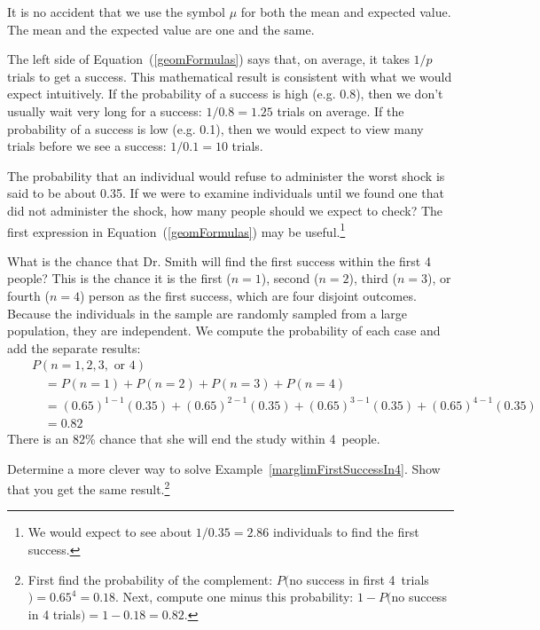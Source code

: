 It is no accident that we use the symbol $\mu$ for both the mean and expected value. The mean and the expected value are one and the same.

The left side of Equation~(\ref{geomFormulas}) says that, on average, it takes $1/p$ trials to get a success. This mathematical result is consistent with what we would expect intuitively. If the probability of a success is high (e.g. 0.8), then we don't usually wait very long for a success: $1/0.8 = 1.25$ trials on average. If the probability of a success is low (e.g. 0.1), then we would expect to view many trials before we see a success: $1/0.1 = 10$ trials.

\begin{exercise}
The probability that an individual would refuse to administer the worst shock is said to be about 0.35. If we were to examine individuals until we found one that did not administer the shock, how many people should we expect to check? The first expression in Equation~(\ref{geomFormulas}) may be useful.\footnote{We would expect to see about $1/0.35 = 2.86$ individuals to find the first success.}
\end{exercise}

\begin{example}{What is the chance that Dr. Smith will find the first success within the first 4 people?} \label{marglimFirstSuccessIn4}
This is the chance it is the first ($n=1$), second ($n=2$), third ($n=3$), or fourth ($n=4$) person as the first success, which are four disjoint outcomes. Because the individuals in the sample are randomly sampled from a large population, they are independent. We compute the probability of each case and add the separate results:
\begin{eqnarray*}
&&P(n=1, 2, 3,\text{ or }4) \\
	&& \quad = P(n=1)+P(n=2)+P(n=3)+P(n=4) \\
	&& \quad = (0.65)^{1-1}(0.35) + (0.65)^{2-1}(0.35) + (0.65)^{3-1}(0.35) + (0.65)^{4-1}(0.35) \\
	&& \quad = 0.82
\end{eqnarray*}
There is an 82\% chance that she will end the study within 4~people.
\end{example}

\begin{exercise}
Determine a more clever way to solve Example~\ref{marglimFirstSuccessIn4}. Show that you get the same result.\footnote{First find the probability of the complement: $P($no success in first 4~trials$) = 0.65^4 = 0.18$. Next, compute one minus this probability: $1-P($no success in 4 trials$) = 1-0.18 = 0.82$.}
\end{exercise}

